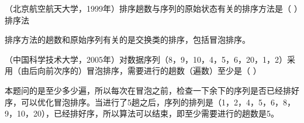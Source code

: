 \question （北京航空航天大学，1999年）排序趟数与序列的原始状态有关的排序方法是（
）排序法
\par{}
\begin{solution}排序方法的趟数和原始序列有关的是交换类的排序，包括冒泡排序。
\end{solution}
\question （中国科学技术大学，2005年）对数据序列（8，9，10，4，5，6，20，1，2）采用（由后向前次序的）冒泡排序，需要进行的趟数（遍数）至少是（
）
\par{}
\begin{solution}本题问的是至少多少遍，所以每次在冒泡之前，检查一下余下的序列是否已经排好序，可以优化冒泡排序。当进行了5趟之后，序列的排列是（1，2，4，5，6，8，9，10，20），已经排好序，所以算法可以结束，即至少需要进行的趟数是5。
\end{solution}
